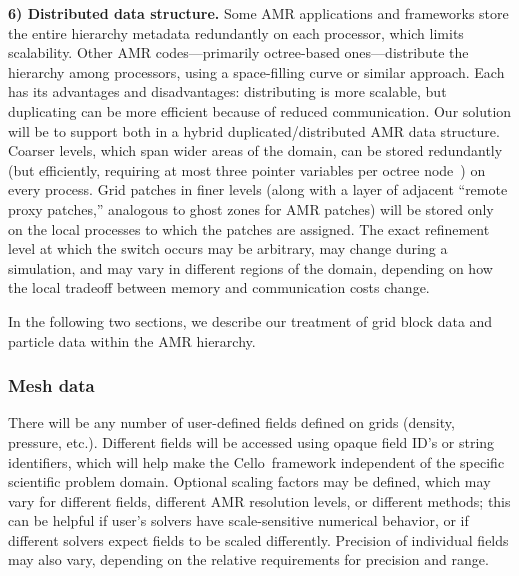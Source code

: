 \documentclass[11pt,letterpaper]{article}
\newcommand{\cello}{\textsf{Cello}}
\begin{document}

\textbf{6) Distributed data structure.}  Some AMR applications and
frameworks store the entire hierarchy metadata redundantly on each
processor, which limits scalability.  Other AMR codes---primarily
octree-based ones---distribute the hierarchy among processors, using
a space-filling curve or similar approach.  Each has its advantages and
disadvantages: distributing is more scalable, but duplicating can be
more efficient because of reduced communication. 
Our solution will be to support both in a hybrid
duplicated/distributed AMR data structure.  Coarser levels, which span
wider areas of the domain, can be stored redundantly (but efficiently,
requiring at most three pointer variables per octree
node~\cite{FrPe02}) on every process.  Grid patches in finer levels
(along with a layer of adjacent ``remote proxy patches,'' analogous to
ghost zones for AMR patches) will be stored only on the local
processes to which the patches are assigned.  The exact refinement
level at which the switch occurs may be arbitrary, may change during a
simulation, and may vary in different regions of the domain, depending
on how the local tradeoff between memory and communication costs
change.

In the following two sections, we describe our treatment of grid block
data and particle data within the AMR hierarchy.

\subsubsection{Mesh data} \label{sss:design-fields}

There will be any number of user-defined fields defined on grids
(density, pressure, etc.).  Different fields will be accessed using
opaque field ID's or string identifiers, which will help make the
\cello\ framework independent of the specific scientific problem
domain.  Optional scaling factors may be defined, which may vary for
different fields, different AMR resolution levels, or different
methods; this can be helpful if user's solvers have scale-sensitive
numerical behavior, or if different solvers expect fields to be scaled
differently.  Precision of individual fields may also vary, depending
on the relative requirements for precision and range.
\end{document}
